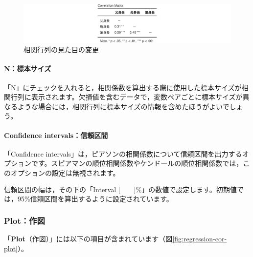 \documentclass[
  12pt,
  a5jpaper,
  lualatex, ja=standard]{bxjsbook}
\begin{document}
\begin{figure}[!ht]

{\centering \includegraphics[width=1\linewidth]{images/regression/paper-cormat} 

}

\caption{相関行列の見た目の変更}\label{fig:regression-paper-cormat}
\end{figure}

\hypertarget{nux6a19ux672cux30b5ux30a4ux30ba}{%
\paragraph*{N：標本サイズ}\label{nux6a19ux672cux30b5ux30a4ux30ba}}

「N」にチェックを入れると，相関係数を算出する際に使用した標本サイズが相関行列に表示されます。欠損値を含むデータで，変数ペアごとに標本サイズが異なるような場合には，相関行列に標本サイズの情報を含めたほうがよいでしょう。

\hypertarget{confidence-intervalsux4fe1ux983cux533aux9593}{%
\paragraph*{Confidence intervals：信頼区間}\label{confidence-intervalsux4fe1ux983cux533aux9593}}

「Confidence intervals」は，ピアソンの相関係数について信頼区間を出力するオプションです。スピアマンの順位相関係数やケンドールの順位相関係数では，このオプションの設定は無視されます。

信頼区間の幅は，その下の「Interval {[}　　{]}\%」の数値で設定します。初期値では，95\%信頼区間を算出するように設定されています。

\hypertarget{plotux4f5cux56f3-1}{%
\subsubsection*{Plot：作図}\label{plotux4f5cux56f3-1}}

「\textbf{Plot}（作図）」には以下の項目が含まれています（図\ref{fig:regression-cor-plot}）。
\end{document}
